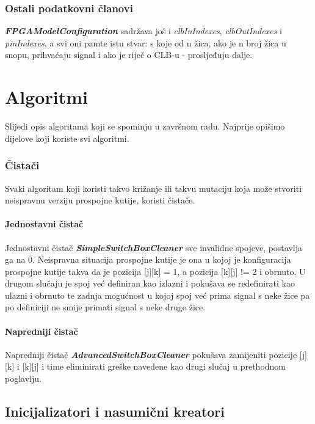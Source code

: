 \documentclass[times, utf8, zavrsni]{fer}
\begin{document}
\subsubsection{Ostali podatkovni članovi}

\textbf{\emph{FPGAModelConfiguration}} sadržava još i \emph{clbInIndexes}, \emph{clbOutIndexes} i \emph{pinIndexes}, a svi oni pamte istu stvar: s koje od n žica, ako je n broj žica u snopu, prihvaćaju signal i ako je riječ o CLB-u - prosljeđuju dalje.

\section{Algoritmi}

Slijedi opis algoritama koji se spominju u završnom radu. Najprije opišimo dijelove koji koriste svi algoritmi.

\subsubsection{Čistači}

Svaki algoritam koji koristi takvo križanje ili takvu mutaciju koja može stvoriti neispravnu verziju prospojne kutije, koristi čistače. 

\paragraph{Jednostavni čistač}

Jednostavni čistač \textbf{\emph{SimpleSwitchBoxCleaner}} sve invalidne spojeve, postavlja ga na 0. Neispravna situacija prospojne kutije je ona u kojoj je konfiguracija prospojne kutije takva da je pozicija [j][k] = 1, a pozicija [k][j] != 2 i obrnuto. U drugom slučaju je spoj već definiran kao izlazni i pokušava se redefinirati kao ulazni i obrnuto te zadnja mogućnost u kojoj spoj već prima signal s neke žice pa po definiciji ne smije primati signal s neke druge žice. 

\paragraph{Napredniji čistač}

Napredniji čistač \textbf{\emph{AdvancedSwitchBoxCleaner}} pokušava zamijeniti pozicije [j][k] i [k][j] i time eliminirati greške navedene kao drugi slučaj u prethodnom poglavlju.

\subsection{Inicijalizatori i nasumični kreatori}
\end{document}
